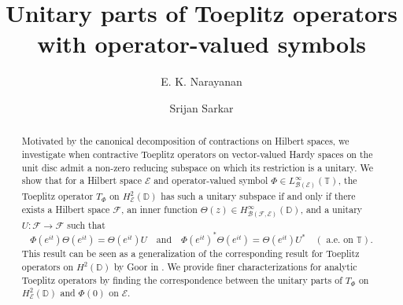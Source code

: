 \documentclass[12pt]{amsart}
\numberwithin{equation}{section}
\theoremstyle{definition}
\newcommand{\D}{\mathbb{D}}
\newcommand{\1}{{\mbox{\bf 1}}}
\begin{document}
\title[Unitary part of Toeplitz operators]{Unitary parts of Toeplitz operators with operator-valued symbols}


\author[Narayanan]{E. K. Narayanan}
\address{Department of Mathematics, Indian Institute of Science, Bangalore, 560012, India}

\author[Sarkar]{Srijan Sarkar}
\address{Department of Mathematics, Indian Institute of Science, Bangalore, 560012, India}


\begin{abstract}
Motivated by the canonical decomposition of contractions on Hilbert spaces, we investigate when contractive Toeplitz operators on vector-valued Hardy spaces on the unit disc admit a non-zero reducing subspace on which its restriction is a unitary. We show that for a Hilbert space $\mathcal{E}$ and operator-valued symbol $\Phi \in L_{\mathcal{B}(\mathcal{E})}^{\infty}(\mathbb{T})$, the Toeplitz operator $T_{\Phi}$ on $H_{\mathcal{E}}^2(\D)$ has such a unitary subspace if and only if there exists a Hilbert space $\mathcal{F}$, an inner function $\Theta(z) \in  H_{\mathcal{B}(\mathcal{F}, \mathcal{E})}^{\infty}(\D)$, and a unitary $U:\mathcal{F} \rightarrow \mathcal{F}$ such that
\[
\Phi(e^{it}) \Theta(e^{it}) = \Theta(e^{it}) U \quad \text{and} \quad  \Phi(e^{it})^* \Theta(e^{it}) = \Theta(e^{it}) U^* \quad (\text{ a.e. on }\mathbb{T}).
\]
This result can be seen as a generalization of the corresponding result for Toeplitz operators on $H^2(\mathbb{D})$ by Goor in \cite{Goor}.  We provide finer characterizations for analytic Toeplitz operators by finding the correspondence between the unitary parts of $T_{\Phi}$ on $H_{\mathcal{E}}^2(\mathbb{D})$ and $\Phi(0)$ on $\mathcal{E}$. 
\end{abstract}

\maketitle
\end{document}
